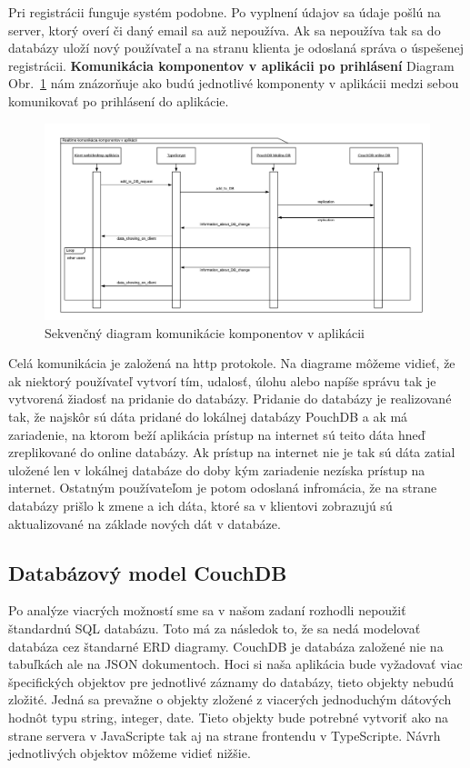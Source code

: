\indent Pri registrácii funguje systém podobne. Po vyplnení údajov sa údaje pošlú na server, ktorý overí či daný email sa auž nepoužíva. Ak sa nepoužíva tak sa do databázy uloží nový používateľ a na stranu klienta je odoslaná správa o úspešenej registrácii. 
\newpage
\textbf{Komunikácia komponentov v aplikácii po prihlásení} \newline
\indent Diagram Obr.~\ref{fig:seq_com} nám znázorňuje ako budú jednotlivé komponenty v aplikácii medzi sebou komunikovať po prihlásení do aplikácie.
\begin{figure}[H]
    \centering
    \includegraphics[scale=0.50]{img/seq_tim.png}
    \caption{Sekvenčný diagram komunikácie komponentov v aplikácii}
    \label{fig:seq_com}
\end{figure}

\indent Celá komunikácia je založená na http protokole. Na diagrame môžeme vidieť, že ak niektorý používateľ vytvorí tím, udalosť, úlohu alebo napíše správu tak je vytvorená žiadosť na pridanie do databázy. Pridanie do databázy je realizované tak, že najskôr sú dáta pridané do lokálnej databázy PouchDB a ak má zariadenie, na ktorom beží aplikácia prístup na internet sú teito dáta hneď zreplikované do online databázy. Ak prístup na internet nie je tak sú dáta zatial uložené len v lokálnej databáze do doby kým zariadenie nezíska prístup na internet. Ostatným používateľom je potom odoslaná infromácia, že na strane databázy prišlo k zmene a ich dáta, ktoré sa v klientovi zobrazujú sú aktualizované na základe nových dát v databáze.  

\subsection{Databázový model CouchDB}
\indent Po analýze viacrých možností sme sa v našom zadaní rozhodli nepoužiť štandardnú SQL databázu. Toto má za následok to, že sa nedá modelovať databáza cez štandarné ERD diagramy. CouchDB je databáza založené nie na tabuľkách ale na JSON dokumentoch. Hoci si naša aplikácia bude vyžadovať viac špecifických objektov pre jednotlivé záznamy do databázy, tieto objekty nebudú zložité. Jedná sa prevažne o objekty zložené z viacerých jednoduchým dátových hodnôt typu string, integer, date. Tieto objekty bude potrebné vytvoriť ako na strane servera v JavaScripte tak aj na strane frontendu v TypeScripte. Návrh jednotlivých objektov môžeme vidieť nižšie. 

